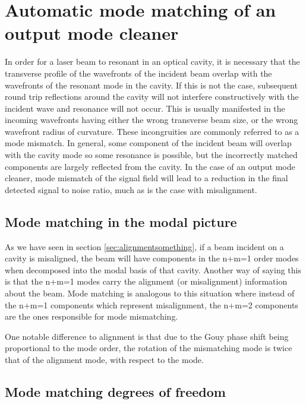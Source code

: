 \chapter{Automatic mode matching of an output mode cleaner}
In order for a laser beam to resonant in an optical cavity, it is necessary that the transverse profile of the wavefronts of the incident beam overlap with the wavefronts of the resonant mode in the cavity. %
If this is not the case, subsequent round trip reflections around the cavity will not interfere constructively with the incident wave and resonance will not occur. %
This is usually manifested in the incoming wavefronts having either the wrong transverse beam size, or the wrong wavefront radius of curvature. %
These incongruities are commonly referred to as a mode mismatch. %
In general, some component of the incident beam will overlap with the cavity mode so some resonance is possible, but the incorrectly matched components are largely reflected from the cavity. %
In the case of an output mode cleaner, mode mismatch of the signal field will lead to a reduction in the final detected signal to noise ratio, much as is the case with misalignment.

\section{Mode matching in the modal picture}
As we have seen in section \ref{sec:alignmentsomething}, if a beam incident on a cavity is misaligned, the beam will have components in the n+m=1 order modes when decomposed into the modal basis of that cavity. %
Another way of saying this is that the n+m=1 modes carry the alignment (or misalignment) information about the beam. %
Mode matching is analogous to this situation where instead of the n+m=1 components which represent misalignment, the n+m=2 components are the ones responsible for mode mismatching.

One notable difference to alignment is that due to the Gouy phase shift being proportional to the mode order, the rotation of the mismatching mode is twice that of the alignment mode, with respect to the  mode.

\section{Mode matching degrees of freedom}


